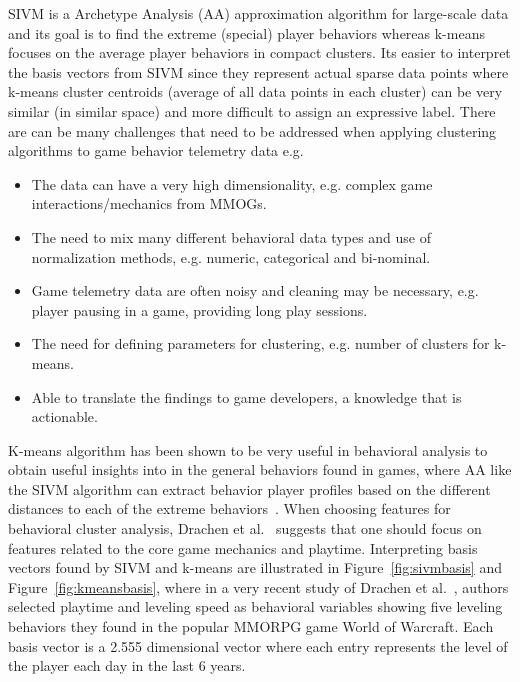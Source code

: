 SIVM is a Archetype Analysis (AA) approximation algorithm for large-scale data and its goal is to find the extreme (special) player behaviors whereas k-means focuses on the average player behaviors in compact clusters. Its easier to interpret the basis vectors from SIVM since they represent actual sparse data points where k-means cluster centroids (average of all data points in each cluster) can be very similar (in similar space) and more difficult to assign an expressive label. There are can be many challenges that need to be addressed when applying clustering algorithms to game behavior telemetry data e.g.
\begin{itemize}
\item The data can have a very high dimensionality, e.g. complex game interactions/mechanics from MMOGs.
\item The need to mix many different behavioral data types and use of normalization methods, e.g. numeric, categorical and bi-nominal.
\item Game telemetry data are often noisy and cleaning may be necessary, e.g. player pausing in a game, providing long play sessions.
\item The need for defining parameters for clustering, e.g. number of clusters for k-means.
\item Able to translate the findings to game developers, a knowledge that is actionable.
\end{itemize}

K-means algorithm has been shown to be very useful in behavioral analysis to obtain useful insights into in the general behaviors found in games, where AA like the SIVM algorithm can extract behavior player profiles based on the different distances to each of the extreme behaviors~\citep{Drachen:2013}. When choosing features for behavioral cluster analysis, Drachen et al.~\citep{Drachen:2009TGA, Drachen:2012} suggests that one should focus on features related to the core game mechanics and playtime. Interpreting basis vectors found by SIVM and k-means are illustrated in Figure~\ref{fig:sivmbasis} and Figure~\ref{fig:kmeansbasis}, where in a very recent study of Drachen et al.~\citep{Drachen:2013}, authors selected playtime and leveling speed as behavioral variables showing five leveling behaviors they found in the popular MMORPG game World of Warcraft. Each basis vector is a 2.555 dimensional vector where each entry represents the level of the player each day in the last 6 years.\\


